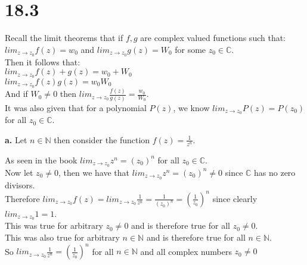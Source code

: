 \documentclass{article}
\begin{document}
\newpage
\section*{18.3}
\begin{center}
    \doublespacing
    Recall the limit theorems that if $f, g$ are complex valued functions such that:
    \\$lim_{z\rightarrow z_0} f(z) = w_0$ and $lim_{z\rightarrow z_0} g(z) = W_0$ for some $z_0\in\mathbb{C}$.
    \\Then it follows that:
    \\$lim _{z\rightarrow z_0} f(z) + g(z) = w_0 + W_0$
    \\$lim _{z\rightarrow z_0} f(z) g(z) = w_0 W_0$
    \\And if $W_0\neq 0$ then $lim _{z\rightarrow z_0}\frac{f(z)}{g(z)} =\frac{w_0}{W_0}$.
    \\It was also given that for a polynomial $P(z)$, we know $lim_{z\rightarrow z_0} P(z) = P(z_0)$ for all $z_0\in\mathbb{C}$.
\end{center}

{\Large\textbf{a.}} Let $n\in\mathbb{N}$ then consider the function $f(z) =\frac{1}{z^n}$.
\begin{center}
    \doublespacing
    As seen in the book $lim _{z\rightarrow z_0} z^n = (z_0)^n$ for all $z_0\in\mathbb{C}$.
    \\Now let $z_0\neq 0$, then we have that $lim _{z\rightarrow z_0} z^n = (z_0)^n\neq 0$ since $\mathbb{C}$ has no zero divisors.
    \\Therefore $lim _{z\rightarrow z_0} f(z) = lim _{z\rightarrow z_0}\frac{1}{z^n} =\frac{1}{(z_0)^n} = (\frac{1}{z_0})^n$ since clearly $lim _{z\rightarrow z_0} 1 = 1$.
    \\This was true for arbitrary $z_0\neq 0$ and is therefore true for all $z_0\neq 0$.
    \\This was also true for arbitrary $n\in\mathbb{N}$ and is therefore true for all $n\in\mathbb{N}$.
    \\So $lim _{z\rightarrow z_0}\frac{1}{z^n} = (\frac{1}{z_0})^n$ for all $n\in\mathbb{N}$ and all complex numbers $z_0\neq 0$ \qedsymbol
\end{center}
\end{document}
